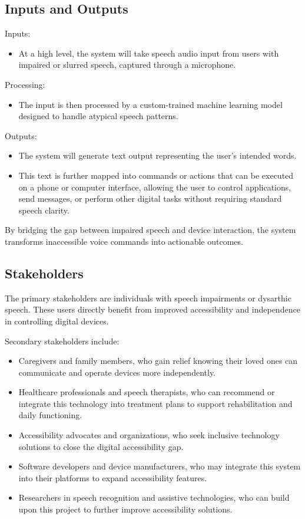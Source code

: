 \documentclass{article}
\begin{document}
\subsection{Inputs and Outputs}
  Inputs:
    \begin{itemize}
      \item At a high level, the system will take speech audio input from users with impaired or slurred speech, captured through a microphone.
    \end{itemize}
  Processing:
    \begin{itemize}
      \item The input is then processed by a custom-trained machine learning model designed to handle atypical speech patterns.
    \end{itemize}
  Outputs:
    \begin{itemize}
      \item The system will generate text output representing the user's intended words.
      \item This text is further mapped into commands or actions that can be executed on a phone or computer interface, allowing the user to control applications, send messages, or perform other digital tasks without requiring standard speech clarity.

    \end{itemize}
    By bridging the gap between impaired speech and device interaction, the system transforms inaccessible voice commands into actionable outcomes.

\subsection{Stakeholders}
The primary stakeholders are individuals with speech impairments or dysarthic speech. These users directly benefit from improved accessibility and independence in controlling digital devices.

Secondary stakeholders include:
\begin{itemize}
  \item Caregivers and family members, who gain relief knowing their loved ones can communicate and operate devices more independently.
  \item Healthcare professionals and speech therapists, who can recommend or integrate this technology into treatment plans to support rehabilitation and daily functioning.
  \item Accessibility advocates and organizations, who seek inclusive technology solutions to close the digital accessibility gap.
  \item Software developers and device manufacturers, who may integrate this system into their platforms to expand accessibility features.
  \item Researchers in speech recognition and assistive technologies, who can build upon this project to further improve accessibility solutions.
\end{itemize}
\end{document}
